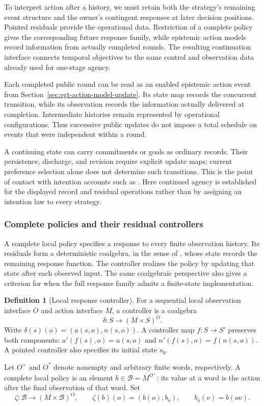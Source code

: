 \documentclass[11pt,a4paper]{article}
\numberwithin{equation}{section}
\theoremstyle{definition}
\newtheorem{definition}[theorem]{Definition}
\theoremstyle{remark}
\theoremstyle{plain}
\begin{document}
To interpret action after a history, we must retain both the
strategy's remaining event structure and the owner's contingent
responses at later decision positions. Pointed residuals provide the
operational data. Restriction of a complete policy gives the corresponding
future response family, while epistemic action models record information
from actually completed rounds. The resulting continuation interface
connects temporal objectives to the same control and observation data
already used for one-stage agency.

Each completed public round can be read as an enabled epistemic
action event from Section~\ref{sec:egt-action-model-update}. Its
state map records the concurrent transition, while its observation
records the information actually delivered at completion. Intermediate
histories remain represented by operational configurations. Thus
successive public updates do not impose a total schedule on events
that were independent within a round.

A continuing state can carry commitments or goals as ordinary
records. Their persistence, discharge, and revision require explicit
update maps; current preference selection alone does not determine
such transitions. This is the point of contact with intention accounts
such as \citet{CohenLevesque1990Intention}. Here continued agency is
established for the displayed record and residual operations rather
than by assigning an intention law to every strategy.

\subsubsection{Complete policies and their residual controllers}
\label{sec:egt-residual-controllers}

A complete local policy specifies a response to every finite
observation history. Its residuals form a deterministic coalgebra,
in the sense of \citet{Rutten2000UniversalCoalgebra}, whose state
records the remaining response function. The controller realizes the
policy by updating that state after each observed input. The same
coalgebraic perspective also gives a criterion for when the full
response family admits a finite-state implementation.

\begin{definition}[Local response controller]
\label{def:egt-local-controller}
For a sequential local observation interface $O$ and action interface
$M$, a controller is a coalgebra
\[
 \delta:S\longrightarrow(M\times S)^O.
\]
Write $\delta(s)(o)=(a(s,o),n(s,o))$. A controller map $f:S\to S'$
preserves both components:
$a'(f(s),o)=a(s,o)$ and $n'(f(s),o)=f(n(s,o))$.
A pointed controller also specifies its initial state $s_0$.

Let $O^+$ and $O^*$ denote nonempty and arbitrary finite words,
respectively. A complete local policy is an element
$b\in\mathcal B=M^{O^+}$: its value at a word is the action
after the final observation of that word. Set
\[
 \zeta:\mathcal B\to(M\times\mathcal B)^O,\qquad
 \zeta(b)(o)=(b(o),b_o),\qquad b_o(v)=b(ov).
\]
\end{definition}
\end{document}
